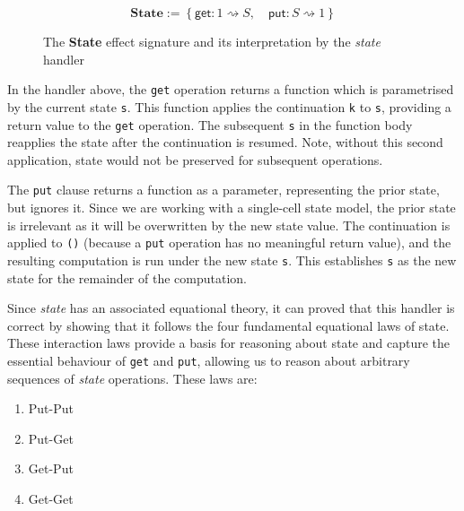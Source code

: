 \documentclass[logo,bsc,singlespacing,parskip]{infthesis}
\begin{document}
\begin{figure}
   
\[
\textbf{State} := \left\{
\mathsf{get} : 1 \rightsquigarrow S, \quad
\mathsf{put} : S \rightsquigarrow 1
\right\}
\]


\caption{The \textbf{State} effect signature and its interpretation by the \textit{state} handler}
\label{fig:state-handler}
\end{figure}

In the handler above, the \lstinline{get} operation returns a function which is parametrised by the current state \lstinline{s}. This function applies the continuation \lstinline{k}  to \lstinline{s}, providing a return value to the \lstinline{get} operation. The subsequent \lstinline{s} in the function body reapplies the state after the continuation is resumed. Note, without this second application, state would not be preserved for subsequent operations. 

The \lstinline{put} clause returns a function as a parameter, representing the prior state, but ignores it. Since we are working with a single-cell state model, the prior state is irrelevant as it will be overwritten by the new state value. The continuation is applied to \lstinline{()} (because a \lstinline{put} operation has no meaningful return value), and the resulting computation is run under the new state \lstinline{s}. This establishes \lstinline{s} as the new state for the remainder of the computation.

Since \textit{state} has an associated equational theory, it can proved that this handler is correct by showing that it follows the four fundamental equational laws of state. These interaction laws provide a basis for reasoning about state and capture the essential behaviour of \lstinline{get} and \lstinline{put}, allowing us to reason about arbitrary sequences of \textit{state} operations. These laws are:

\begin{enumerate}
    \item Put-Put 
    \item Put-Get
    \item Get-Put
    \item Get-Get
\end{enumerate}
\end{document}

